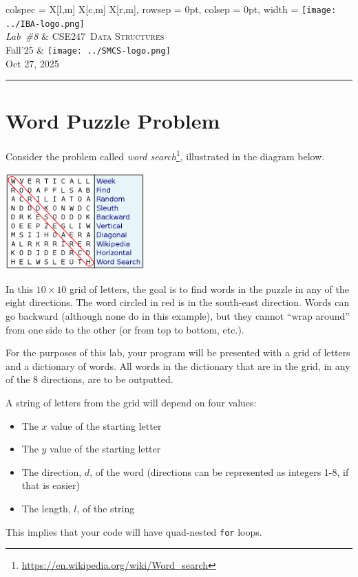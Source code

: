 \documentclass[11pt]{article}
\newcommand{\hmwkTitle}{\emph{Lab\ \#8}}
\newcommand{\hmwkCourseTitle}{Data Structures}
\newcommand{\hmwkCourseCode}{CSE247}
\newcommand{\hmwkSemester}{Fall'25}
\newcommand{\hmwkDueDate}{Oct 27, 2025}
\begin{document}
\thispagestyle{firstpage}
\pagestyle{runningpage}

\noindent
\begin{tblr}{
    colspec = {X[l,m] X[c,m] X[r,m]},
    rowsep = 0pt,
    colsep = 0pt,
    width = \textwidth
}
    {\texttt{[image: ../IBA-logo.png]} \\ \hmwkTitle}
    &
    {\large \hmwkCourseCode\ \textsc{\hmwkCourseTitle} \\[0.2cm] \hmwkSemester}
    &
    {\texttt{[image: ../SMCS-logo.png]} \\ \hmwkDueDate}
\end{tblr}

\noindent\rule{\textwidth}{0.4pt}

\section*{Word Puzzle Problem}
Consider the problem called \textit{word search}\footnote{\url{https://en.wikipedia.org/wiki/Word_search}}, illustrated in the diagram below.
\begin{center}
\includegraphics[width=0.4\textwidth]{wordsearch.png}
\end{center}
In this $10 \times 10$ grid of letters, the goal is to find words in the puzzle in any of the eight directions. The word circled in red is in the south-east direction. Words can go backward (although none do in this example), but they cannot ``wrap around'' from one side to the other (or from top to bottom, etc.).

For the purposes of this lab, your program will be presented with a grid of letters and a dictionary of words. All words in the dictionary that are in the grid, in any of the 8 directions, are to be outputted.

A string of letters from the grid will depend on four values:
\begin{itemize}
\item     The $x$ value of the starting letter
\item     The $y$ value of the starting letter
\item     The direction, $d$, of the word (directions can be represented as integers 1-8, if that is easier)
\item     The length, $l$, of the string
\end{itemize}
This implies that your code will have quad-nested \lstinline|for| loops.
\end{document}
